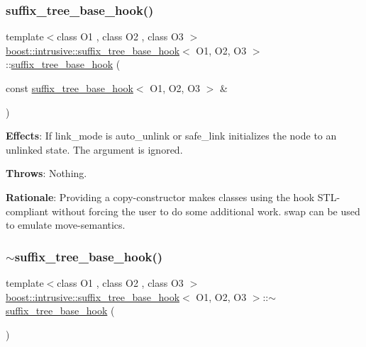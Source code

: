 \subsubsection{\texorpdfstring{suffix\+\_\+tree\+\_\+base\+\_\+hook()}{suffix\_tree\_base\_hook()}\hspace{0.1cm}{\footnotesize\ttfamily [2/2]}}
{\footnotesize\ttfamily template$<$class O1 , class O2 , class O3 $>$ \\
\hyperlink{classboost_1_1intrusive_1_1suffix__tree__base__hook}{boost\+::intrusive\+::suffix\+\_\+tree\+\_\+base\+\_\+hook}$<$ O1, O2, O3 $>$\+::\hyperlink{classboost_1_1intrusive_1_1suffix__tree__base__hook}{suffix\+\_\+tree\+\_\+base\+\_\+hook} (\begin{DoxyParamCaption}\item[{const \hyperlink{classboost_1_1intrusive_1_1suffix__tree__base__hook}{suffix\+\_\+tree\+\_\+base\+\_\+hook}$<$ O1, O2, O3 $>$ \&}]{ }\end{DoxyParamCaption})}

{\bfseries Effects}\+: If link\+\_\+mode is {\ttfamily auto\+\_\+unlink} or {\ttfamily safe\+\_\+link} initializes the node to an unlinked state. The argument is ignored.

{\bfseries Throws}\+: Nothing.

{\bfseries Rationale}\+: Providing a copy-\/constructor makes classes using the hook S\+T\+L-\/compliant without forcing the user to do some additional work. {\ttfamily swap} can be used to emulate move-\/semantics. \mbox{\label{classboost_1_1intrusive_1_1suffix__tree__base__hook_a5b93f2dd321b1ebf770e953bf884853d}} 
\subsubsection{\texorpdfstring{$\sim$suffix\+\_\+tree\+\_\+base\+\_\+hook()}{~suffix\_tree\_base\_hook()}}
{\footnotesize\ttfamily template$<$class O1 , class O2 , class O3 $>$ \\
\hyperlink{classboost_1_1intrusive_1_1suffix__tree__base__hook}{boost\+::intrusive\+::suffix\+\_\+tree\+\_\+base\+\_\+hook}$<$ O1, O2, O3 $>$\+::$\sim$\hyperlink{classboost_1_1intrusive_1_1suffix__tree__base__hook}{suffix\+\_\+tree\+\_\+base\+\_\+hook} (\begin{DoxyParamCaption}{ }\end{DoxyParamCaption})}

